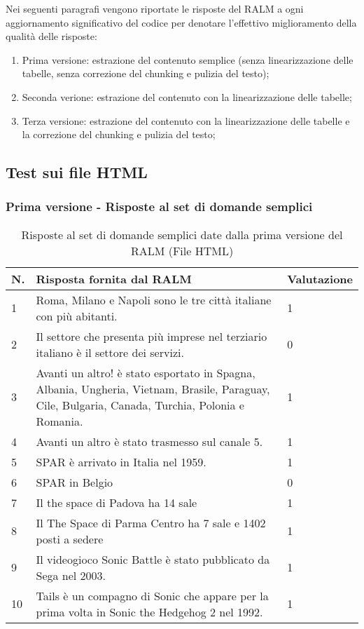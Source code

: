 Nei seguenti paragrafi vengono riportate le risposte del RALM a ogni aggiornamento significativo del codice per denotare l'effettivo miglioramento della qualità delle risposte:

\begin{enumerate}
    \item Prima versione: estrazione del contenuto semplice (senza linearizzazione delle tabelle, senza correzione del chunking e pulizia del testo);
    \item Seconda verione: estrazione del contenuto con la linearizzazione delle tabelle;
    \item Terza versione: estrazione del contenuto con la linearizzazione delle tabelle e la correzione del chunking e pulizia del testo;

\end{enumerate}


\subsection{Test sui file HTML}

\subsubsection{Prima versione - Risposte al set di domande semplici}

\begin{table}[H]
    \centering
    \begin{tabular}{|p{0.5cm} |p{6cm} |p{2cm}|}
        \hline
        \textbf{N}. & \textbf{Risposta fornita dal RALM} & \textbf{Valutazione} \\
        \hline
        1 & Roma, Milano e Napoli sono le tre città italiane con più abitanti. & 1 \\
        \hline
        2 & Il settore che presenta più imprese nel terziario italiano è il settore dei servizi. & 0 \\
        \hline
        3 & Avanti un altro! è stato esportato in Spagna, Albania, Ungheria, Vietnam, Brasile, Paraguay, Cile, Bulgaria, Canada, Turchia, Polonia e Romania. & 1 \\
        \hline
        4 & Avanti un altro è stato trasmesso sul canale 5. & 1 \\
        \hline
        5 & SPAR è arrivato in Italia nel 1959. & 1 \\
        \hline
        6 &  SPAR in Belgio & 0 \\
        \hline
        7 & Il the space di Padova ha 14 sale & 1 \\
        \hline
        8 & Il The Space di Parma Centro ha 7 sale e 1402 posti a sedere & 1 \\
        \hline
        9 & Il videogioco Sonic Battle è stato pubblicato da Sega nel 2003. & 1 \\
        \hline
        10 & Tails è un compagno di Sonic che appare per la prima volta in Sonic the Hedgehog 2 nel 1992. & 1 \\
        \hline
    \end{tabular}
    \caption{Risposte al set di domande semplici date dalla prima versione del RALM (File HTML)}
\end{table}

